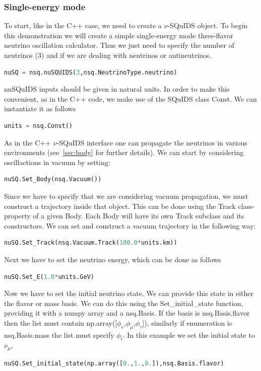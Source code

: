 \documentclass[3p,12pt]{elsarticle}
\newcommand{\ttf}{\ttfamily}
\begin{document}
\subsubsection{Single-energy mode}

To start, like in the {\ttf C++} case, we need to create a $\nu$-SQuIDS object. 
To begin this demonstration we will create a simple single-energy mode three-flavor neutrino oscillation calculator.
Thus we just need to specify the number of neutrinos (3) and if we are dealing with neutrinos or antineutrinos.
\begin{lstlisting}[language=Python, breaklines=true]
nuSQ = nsq.nuSQUIDS(3,nsq.NeutrinoType.neutrino)
\end{lstlisting}

nuSQuIDS inputs should be given in natural units.
In order to make this convenient, as in the {\ttf C++} code, we make use of the {\ttf SQuIDS} class {\ttf Const}.
We can instantiate it as follows
\begin{lstlisting}[language=Python, breaklines=true]
units = nsq.Const()
\end{lstlisting}

As in the {\ttf C++} $\nu$-SQuIDS interface one can propagate the neutrinos in various environments
(see~\ref{sec:body} for further details). We can start by considering oscillactions in vacuum by setting:
\begin{lstlisting}[language=Python, breaklines=true]
nuSQ.Set_Body(nsq.Vacuum())
\end{lstlisting}

Since we have to specify that we are considering vacuum propagation, 
we must construct a trajectory inside that object. This can be done using the {\ttf Track} class-property of a given {\ttf Body}.
Each {\ttf Body} will have its own {\ttf Track} subclass and its constructors. We can set and construct a vacuum trajectory in the following way:
\begin{lstlisting}[language=Python, breaklines=true]
nuSQ.Set_Track(nsq.Vacuum.Track(100.0*units.km))
\end{lstlisting}

Next we have to set the neutrino energy, which can be done as follows
\begin{lstlisting}[language=Python, breaklines=true]
nuSQ.Set_E(1.0*units.GeV)
\end{lstlisting}

Now we have to set the initial neutrino state. We can provide this state in either the flavor or mass basis.
We can do this using the {\ttf Set\_initial\_state} function, providing it with a numpy array and a {\ttf nsq.Basis}.
If the basis is {\ttf nsq.Basis.flavor} then the list must contain {\ttf np.array([}$\phi_e$,$\phi_\mu$,$\phi_\tau${\ttf ])}, 
similarly if enumeration is {\ttf nsq.Basis.mass} the list must specify $\phi_i$.
In this example we set the initial state to $\nu_\mu$,
\begin{lstlisting}[language=Python, breaklines=true]
nuSQ.Set_initial_state(np.array([0.,1.,0.]),nsq.Basis.flavor)
\end{lstlisting}
\end{document}
